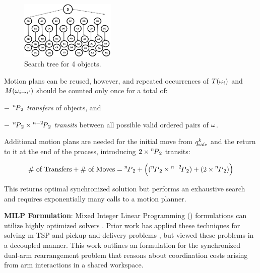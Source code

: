 \begin{figure}
	\centering
	\includegraphics[width=1.8in]{figures/dual_backtracking.PNG}
	\caption{Search tree for 4 objects. 
	}
	\label{fig:backtracking}
\end{figure}
Motion plans can be reused, however, and repeated occurrences of $T(\coma_i)$ and $M(\coma_{i\rightarrow i^{\prime}})$ should be counted only once for a total of: 
\begin{myitem}
\item[$-$] $  {\permu[n]{2}} $ \textit{transfers} of objects, and 
\item[$-$] $ {{\permu[n]{2}}\times\permu[n-2]{2}} $ \textit{transits} between all possible valid ordered pairs of $ \coma $.
\end{myitem}
Additional motion plans are needed for the initial move from $q_{\rm safe}^k$ and the return to it at the end of the process, introducing $ 2\times\permu[n]{2} $ transits:

\begin{equation}
\textrm{\# of Transfers} + \textrm{\# of Moves} =  {\permu[n]{2}} +   \Big{(}({{\permu[n]{2}}\times\permu[n-2]{2}}) + (2\times{\permu[n]{2}})\Big{)}
\label{eq:mpcount}
\end{equation}

This returns optimal synchronized solution but performs an exhaustive search and requires exponentially many calls to a motion planner.

\noindent\textbf{MILP Formulation}:
Mixed Integer Linear Programming (\milp) formulations can utilize highly optimized solvers \cite{gurobi}. Prior work has applied these techniques for solving m-TSP \cite{rathinam2006matroid,friggstad2013multiple} and pickup-and-delivery problems \cite{coltin2014multi,savelsbergh1995general}, but viewed these problems in a decoupled manner. This work outlines an \milp formulation for the synchronized dual-arm rearrangement problem that reasons about coordination costs arising from arm interactions in a shared workspace.

